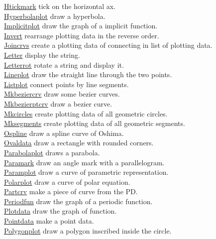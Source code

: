 \documentclass[papersize,a4paper,12pt]{article}
\begin{document}
\begin{tabbing}
\hyperlink{htickmark}{Htickmark} \> tick on the horizontal ax.\\
\hyperlink{hyperbolaplot}{Hyperbolaplot} \> draw a hyperbola.\\
\hyperlink{implicitplot}{Implicitplot} \> draw the graph of a implicit function.\\
\hyperlink{invert}{Invert} \> rearrange plotting data in the reverse order.\\
\hyperlink{joincrvs}{Joincrvs} \> create a plotting data of connecting in list of plotting data.\\
\hyperlink{letter}{Letter} \> display the string.\\
\hyperlink{letterrot}{Letterrot} \> rotate a string and display it.\\
\hyperlink{lineplot}{Lineplot} \> draw the straight line through the two points.\\
\hyperlink{listplot}{Listplot} \> connect points by line segments.\\
\hyperlink{mkbeziercrv}{Mkbeziercrv} \> draw some bezier curves.\\
\hyperlink{mkbezierptcrv}{Mkbezierptcrv} \> draw a bezier curve.\\
\hyperlink{mkcircles}{Mkcircles} \> create plotting data of all geometric circles.\\
\hyperlink{mksegments}{Mksegments} \> create plotting data of all geometric segments.\\
\hyperlink{ospline}{Ospline} \> draw a spline curve of Oshima.\\
\hyperlink{ovaldata}{Ovaldata} \> draw a rectangle with rounded corners.\\
\hyperlink{parabolaplot}{Parabolaplot} \> draws a parabola.\\
\hyperlink{paramark}{Paramark} \> draw an angle mark with a parallelogram.\\
\hyperlink{paramplot}{Paramplot} \> draw a curve of parametric representation.\\
\hyperlink{polarplot}{Polarplot}\> draw a curve of polar equation.\\
\hyperlink{partcrv}{Partcrv} \> make a piece of curve from the PD.\\
\hyperlink{periodfun}{Periodfun} \> draw the graph of a periodic function.\\
\hyperlink{plotdata}{Plotdata} \> draw the graph of function.\\
\hyperlink{pointdata}{Pointdata} \> make a point data.\\
\hyperlink{polygonplot}{Polygonplot} \> draw a polygon inscribed inside the circle.\\

\end{tabbing}
\end{document}
